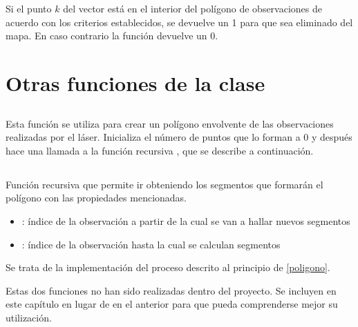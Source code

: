 Si el punto $k$ del vector  está en el interior del polígono de observaciones de acuerdo con los criterios establecidos, se devuelve un 1 para que sea eliminado del mapa. En caso contrario la función devuelve un 0.


\section { Otras funciones de la clase }


\subsection {}


Esta función se utiliza para crear un polígono envolvente de las observaciones realizadas por el láser.
Inicializa el número de puntos que lo forman a 0 y después hace una llamada a la función recursiva , que se describe a continuación.

\subsection {}


Función recursiva que permite ir obteniendo los segmentos que formarán el polígono con las propiedades mencionadas.

\begin{itemize}
  \item {}: índice de la observación a partir de la cual se van a hallar nuevos segmentos
  \item {}: índice de la observación hasta la cual se calculan segmentos
\end{itemize}

Se trata de la implementación del proceso descrito al principio de \ref{poligono}.

\vspace{0.2cm}
\noindent
Estas dos funciones no han sido realizadas dentro del proyecto. Se incluyen en este capítulo en lugar de en el anterior para que pueda comprenderse mejor su utilización.

\subsection{}

